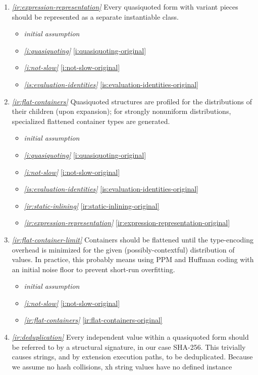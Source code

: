 \documentclass{report}
\makeatletter
\newcommand*{\Label}[2]{%
  \@bsphack
  \begingroup
    \label{#1-original}%
    \def\@currentlabel{#2}%
    \label{#1}%
  \endgroup
  \@esphack
}
\newcommand{\initial}{{\em initial assumption}}
\newcommand{\refboth}[1]{{\em \ref{#1}} \ref{#1-original}}
\makeatother
\begin{document}
\begin{enumerate}
\item{}\Label{ir:expression-representation}{xhr.representation}{\em\ref{ir:expression-representation}}
  Every quasiquoted form with variant pieces should be represented as a
  separate instantiable class.
\begin{itemize}
\item \initial
\item \refboth{i:quasiquoting}
\item \refboth{i:not-slow}
\item \refboth{is:evaluation-identities}
\end{itemize}
\item{}\Label{ir:flat-containers}{xhr.flatcontainers}{\em\ref{ir:flat-containers}}
  Quasiquoted structures are profiled for the distributions of their
  children (upon expansion); for strongly nonuniform distributions,
  specialized flattened container types are generated.
\begin{itemize}
\item \initial
\item \refboth{i:quasiquoting}
\item \refboth{i:not-slow}
\item \refboth{is:evaluation-identities}
\item \refboth{ir:static-inlining}
\item \refboth{ir:expression-representation}
\end{itemize}
\item{}\Label{ir:flat-container-limit}{xhr.flatlimit}{\em\ref{ir:flat-container-limit}}
  Containers should be flattened until the type-encoding overhead is
  minimized for the given (possibly-contextful) distribution of values. In
  practice, this probably means using PPM and Huffman coding with an
  initial noise floor to prevent short-run overfitting.
\begin{itemize}
\item \initial
\item \refboth{i:not-slow}
\item \refboth{ir:flat-containers}
\end{itemize}
\item{}\Label{ir:deduplication}{xhr.deduplication}{\em\ref{ir:deduplication}}
  Every independent value within a quasiquoted form should be referred to
  by a structural signature, in our case SHA-256. This trivially causes
  strings, and by extension execution paths, to be deduplicated. Because we
  assume no hash collisions, xh string values have no defined instance

\end{enumerate}
\end{document}
